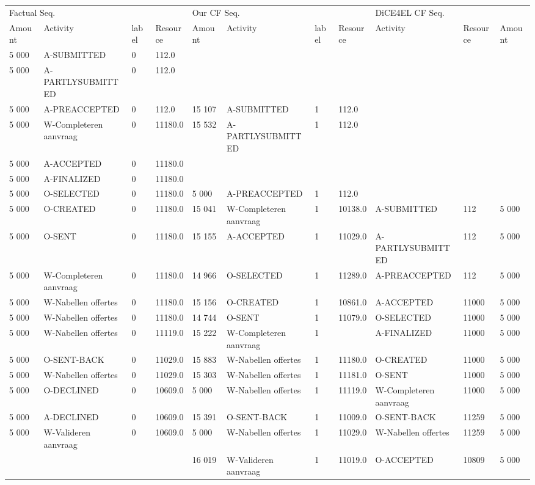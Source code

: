 \begin{tabular}{lllllllllll}
\toprule
\multicolumn{4}{l}{Factual Seq.} & \multicolumn{4}{l}{Our CF Seq.} & \multicolumn{3}{l}{DiCE4EL CF Seq.} \\
Amount & Activity & label & Resource & Amount & Activity & label & Resource & Activity & Resource & Amount \\
\midrule
5 000 & A-SUBMITTED & 0 & 112.0 &  &  &  &  &  &  &  \\
5 000 & A-PARTLYSUBMITTED & 0 & 112.0 &  &  &  &  &  &  &  \\
5 000 & A-PREACCEPTED & 0 & 112.0 & 15 107 & A-SUBMITTED & 1 & 112.0 &  &  &  \\
5 000 & W-Completeren aanvraag & 0 & 11180.0 & 15 532 & A-PARTLYSUBMITTED & 1 & 112.0 &  &  &  \\
5 000 & A-ACCEPTED & 0 & 11180.0 &  &  &  &  &  &  &  \\
5 000 & A-FINALIZED & 0 & 11180.0 &  &  &  &  &  &  &  \\
5 000 & O-SELECTED & 0 & 11180.0 & 5 000 & A-PREACCEPTED & 1 & 112.0 &  &  &  \\
5 000 & O-CREATED & 0 & 11180.0 & 15 041 & W-Completeren aanvraag & 1 & 10138.0 & A-SUBMITTED & 112 & 5 000 \\
5 000 & O-SENT & 0 & 11180.0 & 15 155 & A-ACCEPTED & 1 & 11029.0 & A-PARTLYSUBMITTED & 112 & 5 000 \\
5 000 & W-Completeren aanvraag & 0 & 11180.0 & 14 966 & O-SELECTED & 1 & 11289.0 & A-PREACCEPTED & 112 & 5 000 \\
5 000 & W-Nabellen offertes & 0 & 11180.0 & 15 156 & O-CREATED & 1 & 10861.0 & A-ACCEPTED & 11000 & 5 000 \\
5 000 & W-Nabellen offertes & 0 & 11180.0 & 14 744 & O-SENT & 1 & 11079.0 & O-SELECTED & 11000 & 5 000 \\
5 000 & W-Nabellen offertes & 0 & 11119.0 & 15 222 & W-Completeren aanvraag & 1 &  & A-FINALIZED & 11000 & 5 000 \\
5 000 & O-SENT-BACK & 0 & 11029.0 & 15 883 & W-Nabellen offertes & 1 & 11180.0 & O-CREATED & 11000 & 5 000 \\
5 000 & W-Nabellen offertes & 0 & 11029.0 & 15 303 & W-Nabellen offertes & 1 & 11181.0 & O-SENT & 11000 & 5 000 \\
5 000 & O-DECLINED & 0 & 10609.0 & 5 000 & W-Nabellen offertes & 1 & 11119.0 & W-Completeren aanvraag & 11000 & 5 000 \\
5 000 & A-DECLINED & 0 & 10609.0 & 15 391 & O-SENT-BACK & 1 & 11009.0 & O-SENT-BACK & 11259 & 5 000 \\
5 000 & W-Valideren aanvraag & 0 & 10609.0 & 5 000 & W-Nabellen offertes & 1 & 11029.0 & W-Nabellen offertes & 11259 & 5 000 \\
 &  &  &  & 16 019 & W-Valideren aanvraag & 1 & 11019.0 & O-ACCEPTED & 10809 & 5 000 \\
\bottomrule
\end{tabular}
